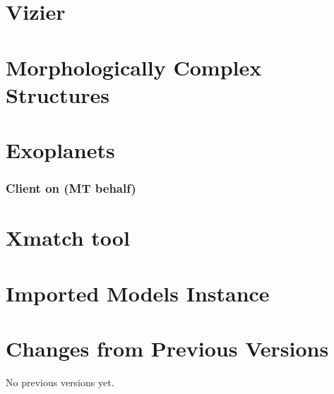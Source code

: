 \documentclass[11pt,a4paper]{ivoa}
\begin{document}
\section{Vizier}


\section{Morphologically Complex Structures}


\section{Exoplanets}


\subsubsection{Client on (MT behalf)}


\section{Xmatch tool }


\section{Imported Models Instance}

\section{Changes from Previous Versions}

No previous versions yet.



\end{document}
